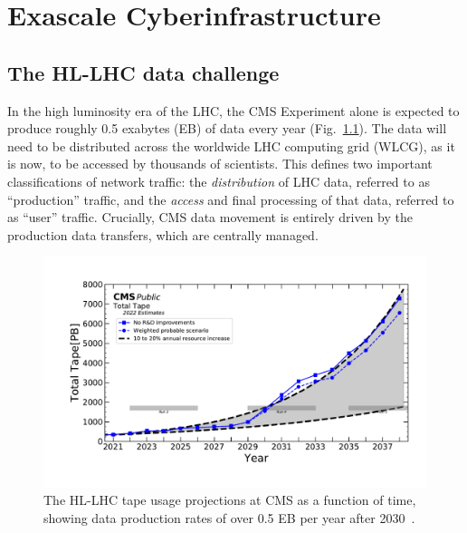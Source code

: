\chapter{Exascale Cyberinfrastructure}\label{ch:cyber}

\section{The HL-LHC data challenge}
In the high luminosity era of the LHC, the CMS Experiment alone is expected to produce roughly 0.5 exabytes (EB) of data every year\footnotemark{} (Fig.~\ref{fig:tape_projections}). 
The data will need to be distributed across the worldwide LHC computing grid (WLCG), as it is now, to be accessed by thousands of scientists. 
This defines two important classifications of network traffic: the \textit{distribution} of LHC data, referred to as ``production'' traffic, and the \textit{access} and final processing of that data, referred to as ``user'' traffic. 
Crucially, CMS data movement is entirely driven by the production data transfers, which are centrally managed. 

\begin{figure}[htb]
    \centering
    \includegraphics[width=.9\textwidth]{fig/cyber/tape_cms2022.pdf}
    \caption[HL-LHC tape usage projections at CMS.]{
        The HL-LHC tape usage projections at CMS as a function of time, showing data production rates of over 0.5 EB per year after 2030~\cite{CMSComputingReport2022}.
    }
    \label{fig:tape_projections}
\end{figure}

